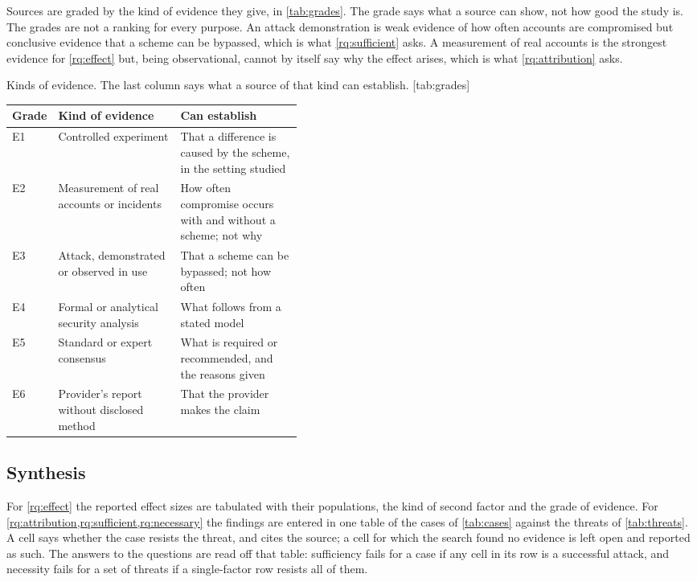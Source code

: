 Sources are graded by the kind of evidence they give, in
\cref{tab:grades}.
The grade says what a source can show, not how good the study is.
The grades are not a ranking for every purpose.
An attack demonstration is weak evidence of how often accounts are
compromised but conclusive evidence that a scheme can be bypassed, which
is what \cref{rq:sufficient} asks.
A measurement of real accounts is the strongest evidence for
\cref{rq:effect} but, being observational, cannot by itself say why the
effect arises, which is what \cref{rq:attribution} asks.
\begin{table}
  \begin{sidecaption}{%
    Kinds of evidence.
    The last column says what a source of that kind can establish.
  }[tab:grades]
    \footnotesize
    \begin{tabular}{@{}llL{0.42\linewidth}@{}}
      \toprule
      Grade & Kind of evidence & Can establish \\
      \midrule
      E1 & Controlled experiment & That a difference is caused by the
        scheme, in the setting studied \\
      E2 & Measurement of real accounts or incidents & How often
        compromise occurs with and without a scheme; not why \\
      E3 & Attack, demonstrated or observed in use & That a scheme can be
        bypassed; not how often \\
      E4 & Formal or analytical security analysis & What follows from a
        stated model \\
      E5 & Standard or expert consensus & What is required or
        recommended, and the reasons given \\
      E6 & Provider's report without disclosed method & That the provider
        makes the claim \\
      \bottomrule
    \end{tabular}
  \end{sidecaption}
\end{table}

\subsection{Synthesis}\label{sec:synthesis}

For \cref{rq:effect} the reported effect sizes are tabulated with their
populations, the kind of second factor and the grade of evidence.
For \cref{rq:attribution,rq:sufficient,rq:necessary} the findings are
entered in one table of the cases of \cref{tab:cases} against the threats
of \cref{tab:threats}.
A cell says whether the case resists the threat, and cites the source;
a cell for which the search found no evidence is left open and reported
as such.
The answers to the questions are read off that table: sufficiency fails
for a case if any cell in its row is a successful attack, and necessity
fails for a set of threats if a single-factor row resists all of them.

